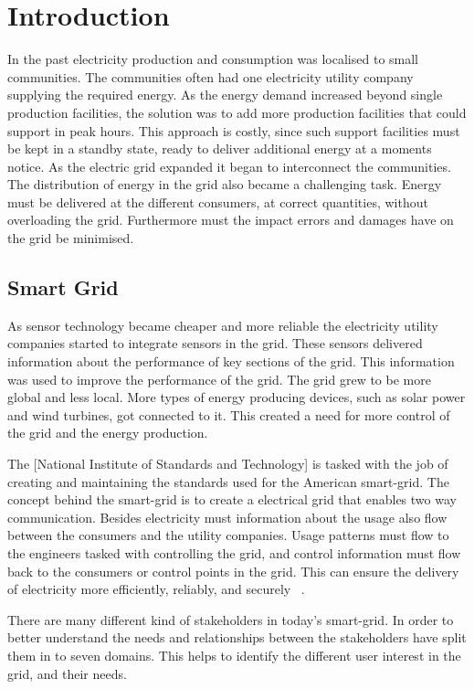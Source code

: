 \chapter{Introduction}

In the past electricity production and consumption was localised to small communities. The communities often had one electricity utility company supplying the required energy. As the energy demand increased beyond single production facilities, the solution was to add more production facilities that could support in peak hours. This approach is costly, since such support facilities must be kept in a standby state, ready to deliver additional energy at a moments notice. As the electric grid expanded it began to interconnect the communities. The distribution of energy in the grid also became a challenging task. Energy must be delivered at the different consumers, at correct quantities, without overloading the grid. Furthermore must the impact errors and damages have on the grid be minimised. 

\section{Smart Grid}
As sensor technology became cheaper and more reliable the electricity utility companies started to integrate sensors in the grid. These sensors delivered information about the performance of key sections of the grid. This information was used to improve the performance of the grid. The grid grew to be more global and less local. More types of energy producing devices, such as solar power and wind turbines, got connected to it. This created a need for more control of the grid and the energy production. 

The [National Institute of Standards and Technology] is tasked with the job of creating and maintaining the standards used for the American smart-grid. The concept behind the smart-grid is to create a electrical grid that enables two way communication. Besides electricity must information about the usage also flow between the consumers and the utility companies. Usage patterns must flow to the engineers tasked with controlling the grid, and control information must flow back to the consumers or control points in the grid. This can ensure the delivery of electricity more efficiently, reliably, and securely ~\citep{RefWorks:42}. 

There are many different kind of stakeholders in today's smart-grid. In order to better understand the needs and relationships between the stakeholders have  split them in to seven domains. This helps to identify the different user interest in the grid, and their needs.  


